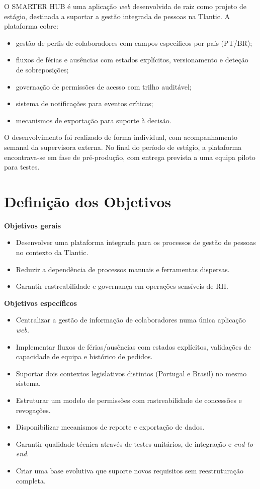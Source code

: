 \documentclass[12pt, a4paper, twoside, openright]{report}
\begin{document}
O SMARTER HUB é uma aplicação \textit{web} desenvolvida de raiz como projeto de estágio,
destinada a suportar a gestão integrada de pessoas na Tlantic. A plataforma cobre:

\begin{itemize}
  \item gestão de perfis de colaboradores com campos específicos por país (PT/BR);
  \item fluxos de férias e ausências com estados explícitos, versionamento e deteção de
        sobreposições;
  \item governação de permissões de acesso com trilho auditável;
  \item sistema de notificações para eventos críticos;
  \item mecanismos de exportação para suporte à decisão.
\end{itemize}

O desenvolvimento foi realizado de forma individual, com acompanhamento semanal da
supervisora externa. No final do período de estágio, a plataforma encontrava-se em
fase de pré-produção, com entrega prevista a uma equipa piloto para testes.

\section{Definição dos Objetivos}
\label{sec:objetivos}

\textbf{Objetivos gerais}

\begin{itemize}
  \item Desenvolver uma plataforma integrada para os processos de gestão de pessoas
        no contexto da Tlantic.
  \item Reduzir a dependência de processos manuais e ferramentas dispersas.
  \item Garantir rastreabilidade e governança em operações sensíveis de RH.
\end{itemize}

\textbf{Objetivos específicos}

\begin{itemize}
  \item Centralizar a gestão de informação de colaboradores numa única aplicação \textit{web}.
  \item Implementar fluxos de férias/ausências com estados explícitos, validações de
        capacidade de equipa e histórico de pedidos.
  \item Suportar dois contextos legislativos distintos (Portugal e Brasil) no mesmo sistema.
  \item Estruturar um modelo de permissões com rastreabilidade de concessões e revogações.
  \item Disponibilizar mecanismos de reporte e exportação de dados.
  \item Garantir qualidade técnica através de testes unitários, de integração e \textit{end-to-end}.
  \item Criar uma base evolutiva que suporte novos requisitos sem reestruturação completa.
\end{itemize}
\end{document}
